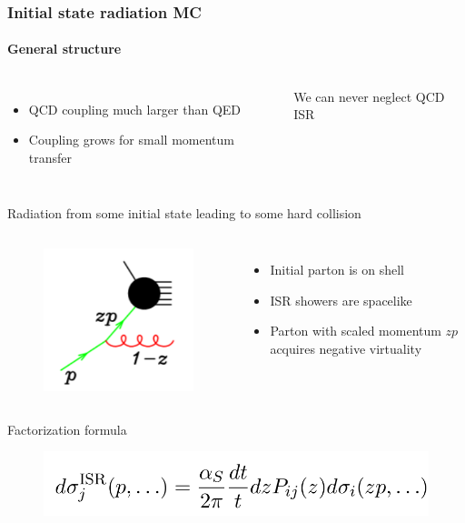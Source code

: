 \documentclass[aspectratio=43]{beamer}
\begin{document}
\begin{frame}

\frametitle{Initial state radiation MC}
\framesubtitle{General structure}
	
	\begin{columns}
	

		\begin{itemize}
			\item \footnotesize QCD coupling much larger than QED
			\item \footnotesize Coupling grows for small momentum transfer
		\end{itemize}

		
		 \footnotesize \color{red}We can never neglect QCD ISR
		 
	\end{columns}

	\vspace{0.5cm}

	\center \footnotesize Radiation from some initial state leading to some hard collision
	\begin{columns}
		
		\column{0.3\textwidth}
		
		\begin{figure}
			\includegraphics[width = 2.5 cm]{plots/ISR_shower0.png}
		\end{figure}
		
		\column{0.6\textwidth}
		
		\begin{itemize}
			\item \footnotesize Initial parton is on shell
			\item \footnotesize ISR showers are spacelike
			\item \footnotesize Parton with scaled momentum $zp$ acquires negative virtuality
		\end{itemize}
	
	\end{columns}

	\vspace{0.25cm}
	
	\center \footnotesize Factorization formula
	\begin{figure}
		\includegraphics[width = 5.5 cm]{plots/ISR_shower0_eq.png}
	\end{figure}

\end{frame}
\end{document}
